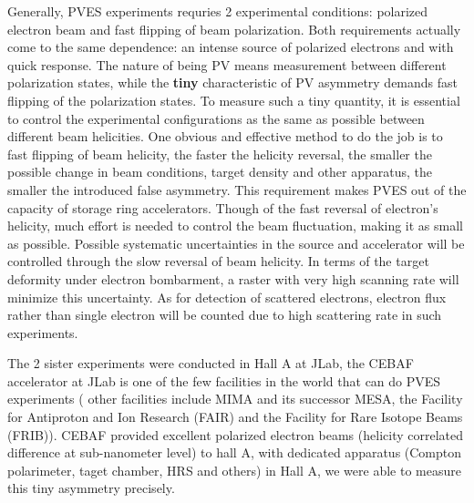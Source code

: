 Generally, PVES experiments requries 2 experimental conditions: polarized electron
beam and fast flipping of beam polarization. Both requirements actually come to 
the same dependence: an intense source of polarized electrons and with quick response. 
The nature of being PV means measurement between different polarization states, 
while the \textbf{tiny} characteristic of PV asymmetry
demands fast flipping of the polarization states.
To measure such a tiny quantity, it is essential to control
the experimental configurations as the same as possible between different
beam helicities. One obvious and effective method to do the job is to fast 
flipping of beam helicity, the faster the helicity reversal, the smaller
the possible change in beam conditions, target density and other apparatus, the smaller
the introduced false asymmetry. This requirement makes PVES out of the capacity
of storage ring accelerators.
Though of the fast reversal of electron's helicity, much effort is needed to
control the beam fluctuation, making it as small as possible. Possible systematic
uncertainties in the source and accelerator will be controlled through the slow
reversal of beam helicity. In terms of the target deformity under electron bombarment,
a raster with very high scanning rate will minimize this uncertainty. As for 
detection of scattered electrons, electron flux rather than single electron will
be counted due to high scattering rate in such experiments.

The 2 sister experiments were conducted in Hall A at JLab, the CEBAF accelerator 
at JLab is one of the few facilities in the world that can do PVES experiments (
other facilities include MIMA and its successor MESA, the Facility for Antiproton
and Ion Research (FAIR) and the Facility for Rare Isotope Beams (FRIB)). CEBAF 
provided excellent polarized electron beams (helicity correlated difference at 
sub-nanometer level) to hall A, with dedicated apparatus 
(Compton polarimeter, taget chamber, HRS and others) in Hall A, we were able 
to measure this tiny asymmetry precisely.

